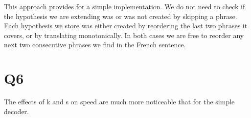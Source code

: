 \documentclass[11pt]{article}
\begin{document}
This approach provides for a simple implementation. We do not need to check if the hypothesis we are extending was or was not created by skipping a phrase. Each hypothesis we store was either created by reordering the last two phrases it covers, or by translating monotonically. In both cases we are free to reorder any next two consecutive phrases we find in the French sentence.

\section*{Q6}

The effects of k and s on speed are much more noticeable that for the simple decoder.
\end{document}
